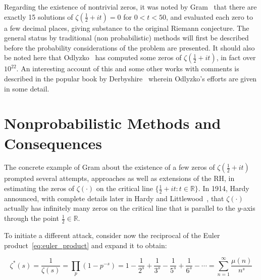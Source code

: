 \documentclass[11pt]{article}
\begin{document}
Regarding the existence of nontrivial zeros, it was noted by Gram~\cite{gram} that there are exactly 15 solutions of $\zeta(\frac{1}{2} + it) = 0$ for $0 < t < 50$, and evaluated each zero to a few decimal places, giving substance to the original Riemann conjecture. The general status by traditional (non probabilistic) methods will first be described before the probability considerations of the problem are presented. It should also be noted here that Odlyzko~\cite{derbyshire} has computed some zeros of $\zeta(\frac{1}{2} + it)$, in fact over $10^{22}$. An interesting account of this and some other works with comments is described in the popular book by Derbyshire~\cite{derbyshire} wherein Odlyzko's efforts are given in some detail.

\section{Nonprobabilistic Methods and Consequences}
\label{sec:nonprob}

The concrete example of Gram about the existence of a few zeros of $\zeta(\frac{1}{2} + it)$ prompted several attempts, approaches as well as extensions of the RH, in estimating the zeros of $\zeta(\cdot)$ on the critical line $\{\frac{1}{2} + it : t \in \mathbb{R}\}$. In 1914, Hardy~\cite{hardy} announced, with complete details later in Hardy and Littlewood~\cite{hardy_littlewood}, that $\zeta(\cdot)$ actually has infinitely many zeros on the critical line that is parallel to the $y$-axis through the point $\frac{1}{2} \in \mathbb{R}$.

To initiate a different attack, consider now the reciprocal of the Euler product~\eqref{eq:euler_product} and expand it to obtain:

\begin{equation}
\label{eq:zeta_reciprocal}
\zeta^*(s) = \frac{1}{\zeta(s)} = \prod_p (1 - p^{-s}) = 1 - \frac{1}{2^s} + \frac{1}{3^s} - \frac{1}{5^s} + \frac{1}{6^s} - \cdots = \sum_{n=1}^\infty \frac{\mu(n)}{n^s}
\end{equation}
\end{document}
